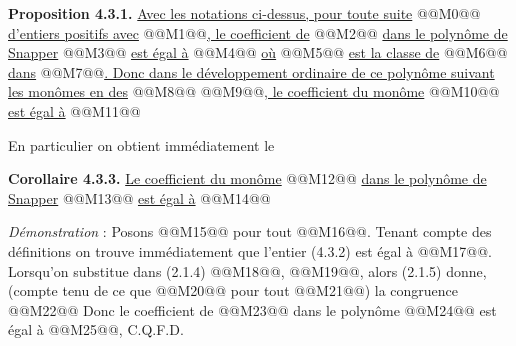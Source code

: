 
\textbf{Proposition 4.3.1.} \uline{Avec les notations ci-dessus, pour toute suite} @@M0@@ \uline{d'entiers positifs avec} @@M1@@\uline{, le coefficient de}
@@M2@@
\uline{dans le polynôme de Snapper} @@M3@@ \uline{est égal à}
@@M4@@
\uline{où} @@M5@@ \uline{est la classe de} @@M6@@ \uline{dans} @@M7@@\uline{. Donc dans le développement ordinaire de ce polynôme suivant les monômes en des} @@M8@@ @@M9@@\uline{, le coefficient du monôme} @@M10@@ \uline{est égal à}
@@M11@@

En particulier on obtient immédiatement le

\textbf{Corollaire 4.3.3.} \uline{Le coefficient du monôme} @@M12@@ \uline{dans le polynôme de Snapper} @@M13@@ \uline{est égal à}
@@M14@@

\emph{Démonstration} : Posons @@M15@@ pour tout @@M16@@. Tenant compte des définitions on trouve immédiatement que l'entier (4.3.2) est égal à @@M17@@. Lorsqu'on substitue dans (2.1.4) @@M18@@, @@M19@@, alors (2.1.5) donne, (compte tenu de ce que @@M20@@ pour tout @@M21@@) la congruence
@@M22@@
Donc le coefficient de @@M23@@ dans le polynôme @@M24@@ est égal à @@M25@@, C.Q.F.D.

